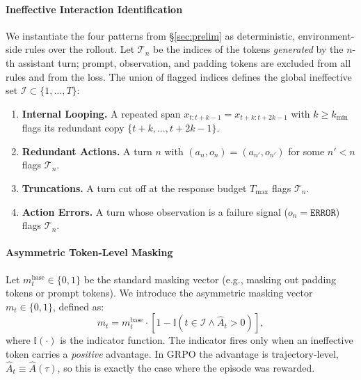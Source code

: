 \documentclass[letterpaper]{article} %
\begin{document}
\paragraph{Ineffective Interaction Identification}
We instantiate the four patterns from \S\ref{sec:prelim} as deterministic, environment-side rules over the rollout. Let $\mathcal{T}_n$ be the indices of the tokens \emph{generated} by the $n$-th assistant turn; prompt, observation, and padding tokens are excluded from all rules and from the loss. The union of flagged indices defines the global ineffective set $\mathcal{I}\subset\{1,\dots,T\}$:
\begin{enumerate}
    \item \textbf{Internal Looping.} A repeated span $x_{t:t+k-1}=x_{t+k:t+2k-1}$ with $k\ge k_{\min}$ flags its redundant copy $\{t+k,\dots,t+2k-1\}$.
    \item \textbf{Redundant Actions.} A turn $n$ with $(a_n,o_n)=(a_{n'},o_{n'})$ for some $n'<n$ flags $\mathcal{T}_n$.
    \item \textbf{Truncations.} A turn cut off at the response budget $T_{\max}$ flags $\mathcal{T}_n$.
    \item \textbf{Action Errors.} A turn whose observation is a failure signal ($o_n=\texttt{ERROR}$) flags $\mathcal{T}_n$.
\end{enumerate}


\paragraph{Asymmetric Token-Level Masking}
Let $m_t^{\text{base}} \in \{0, 1\}$ be the standard masking vector (e.g., masking out padding tokens or prompt tokens). We introduce the asymmetric masking vector $m_t \in \{0, 1\}$, defined as:
\begin{equation}
\label{eq:asymmetric_mask}
    m_t = m_t^{\text{base}} \cdot \left[ 1 - \mathbb{I}\left( t \in \mathcal{I} \land \hat{A}_t > 0 \right) \right],
\end{equation}
where $\mathbb{I}(\cdot)$ is the indicator function. 
The indicator fires only when an ineffective token carries a \emph{positive} advantage. 
In GRPO the advantage is trajectory-level, $\hat{A}_t\equiv\hat{A}(\tau)$, so this is exactly the case where the episode was rewarded.
\end{document}
